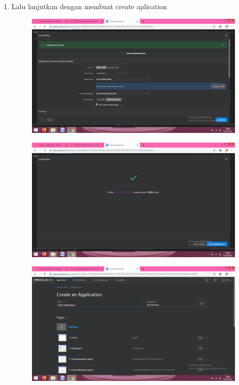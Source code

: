 \begin{enumerate}
	\item Lalu lanjutkan dengan membuat create aplication
	\begin{figure} [!htbp]
	\includegraphics[scale=0.2]{section/gambar/i.png}
	\centering
	\end{figure}
	\begin{figure} [!htbp]
	\includegraphics[scale=0.2]{section/gambar/j.png}
	\centering
	\end{figure}
	
	\begin{figure} [!htbp]
	\includegraphics[scale=0.2]{section/gambar/k.png}
	\centering
	\end{figure}
	

\end{enumerate}
